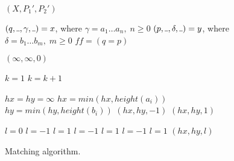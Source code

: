 \documentclass[AMA,STIX1COL]{WileyNJD-v2}
\newcommand{\Xund}{\rule{.4em}{.4pt}}
\begin{document}
\begin{figure*}
\begin{multicols}{2}
\begin{algorithm}[H]
{        \BlankLine
        \Return $(X, P_1', P_2')$ \;
    }
    \end{algorithm}

    \columnbreak


    \newcommand \ff {f\!\!f}

    \begin{algorithm}[H] \DontPrintSemicolon {}
     {
        $(q, \Xund, \gamma, \Xund) = x$, where $\gamma = a_1 \dots a_n, \; n \geq 0$ \;
        $(p, \Xund, \delta, \Xund) = y$, where $\delta = b_1 \dots b_m, \; m \geq 0$ \;
        $\ff = (q = p)$ 

        \BlankLine
        \If { $\ff \wedge \gamma = \delta$ } {
            \Return $(\infty, \infty, 0)$ 
        }

        \BlankLine
        $k = 1$ \;
        \If { $\ff$ } {
             {
              $k = k + 1$ 
            }
        }

        \BlankLine
        \If { $\ff$ } {
             {
                $hx = hy = \infty$
            }
        } 
         {
            $hx = min (hx, height (a_i))$
        }
         {
            $hy = min (hy, height (b_i))$
        }
         {\Return $(hx, hy, -1)$}
         {\Return $(hx, hy, 1)$}

        \BlankLine
        \If { $\ff$ } {
             { $l = 0$ }
             { $l = -1$ }
             { $l = 1$ }
             { $l = -1$ }
             { $l = 1$ }
             { $l = -1$ }
             { $l = 1$ }
        } 
        \Return $(hx, hy, l)$
    }
    \end{algorithm}

\end{multicols}
\begin{center}
\caption{Matching algorithm.}
\end{center}
\end{figure*}
\end{document}
